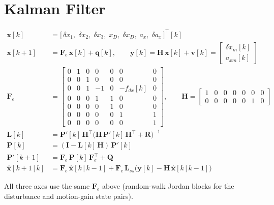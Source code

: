\documentclass[11pt]{article}
\newcommand{\T}{^{\top}}
\begin{document}
\section{Kalman Filter}

\begin{align}
\bm{x}[k] &= \bigl[\,\delta x_1,\;\delta x_2,\;\delta x_3,\;
  x_D,\;\delta x_D,\;a_x,\;\delta a_x\,\bigr]\T[k] \\[4pt]
\bm{x}[k\!+\!1] &= \bm{F}_{e}\,\bm{x}[k] + \bm{q}[k],
  \qquad
  \bm{y}[k] = \bm{H}\,\bm{x}[k] + \bm{v}[k]
  = \begin{bmatrix}\delta x_m[k]\\[2pt] a_{xm}[k]\end{bmatrix} \\[6pt]
\bm{F}_{e} &=
\begin{bmatrix}
  0 & 1 & 0 & 0 & 0 & 0 & 0 \\
  0 & 0 & 1 & 0 & 0 & 0 & 0 \\
  0 & 0 & 1 & -1 & 0 & -f_{dx}[k] & 0 \\
  0 & 0 & 0 & 1 & 1 & 0 & 0 \\
  0 & 0 & 0 & 0 & 1 & 0 & 0 \\
  0 & 0 & 0 & 0 & 0 & 1 & 1 \\
  0 & 0 & 0 & 0 & 0 & 0 & 1
\end{bmatrix},
\qquad
\bm{H} =
\begin{bmatrix}
  1 & 0 & 0 & 0 & 0 & 0 & 0 \\
  0 & 0 & 0 & 0 & 0 & 1 & 0
\end{bmatrix} \\[6pt]
\bm{L}[k] &= \bm{P}'[k]\,\bm{H}\T\bigl(\bm{H}\,\bm{P}'[k]\,\bm{H}\T + \bm{R}\bigr)^{-1} \\[2pt]
\bm{P}[k] &= (\bm{I} - \bm{L}[k]\,\bm{H})\,\bm{P}'[k] \\[2pt]
\bm{P}'[k\!+\!1] &= \bm{F}_{e}\,\bm{P}[k]\,\bm{F}_{e}\T + \bm{Q} \\[4pt]
\hat{\bm{x}}[k\!+\!1\,|\,k] &= \bm{F}_{e}\,\hat{\bm{x}}[k\,|\,k\!-\!1]
  + \bm{F}_{e}\,\bm{L}_{ss}\bigl(\bm{y}[k] - \bm{H}\,\hat{\bm{x}}[k\,|\,k\!-\!1]\bigr)
\end{align}

All three axes use the same $\bm{F}_e$ above (random-walk Jordan blocks
for the disturbance and motion-gain state pairs).

\end{document}
